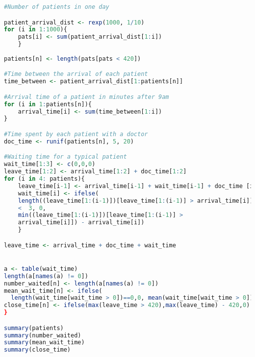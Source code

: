 \documentclass{article}
\begin{document}
\begin{lstlisting}[language=R]
#Number of patients in one day

patient_arrival_dist <- rexp(1000, 1/10)
for (i in 1:1000){
	pats[i] <- sum(patient_arrival_dist[1:i])
	}
	
patients[n] <- length(pats[pats < 420])

#Time between the arrival of each patient
time_between <- patient_arrival_dist[1:patients[n]]

#Arrival time of a patient in minutes after 9am
for (i in 1:patients[n]){
	arrival_time[i] <- sum(time_between[1:i])
}

#Time spent by each patient with a doctor
doc_time <- runif(patients[n], 5, 20)

#Waiting time for a typical patient
wait_time[1:3] <- c(0,0,0)
leave_time[1:2] <- arrival_time[1:2] + doc_time[1:2]
for (i in 4: patients){
	leave_time[i-1] <- arrival_time[i-1] + wait_time[i-1] + doc_time [i-1]
	wait_time[i] <- ifelse(
	length((leave_time[1:(i-1)])[leave_time[1:(i-1)] > arrival_time[i]]) 
	<  3, 0,
	min((leave_time[1:(i-1)])[leave_time[1:(i-1)] > 
	arrival_time[i]]) - arrival_time[i])
	}

leave_time <- arrival_time + doc_time + wait_time


a <- table(wait_time)
length(a[names(a) != 0])
number_waited[n] <- length(a[names(a) != 0])
mean_wait_time[n] <- ifelse(
  length(wait_time[wait_time > 0])==0,0, mean(wait_time[wait_time > 0]))
close_time[n] <- ifelse(max(leave_time > 420),max(leave_time) - 420,0)
}

summary(patients)
summary(number_waited)
summary(mean_wait_time)
summary(close_time)

\end{lstlisting}
  
\end{document}
